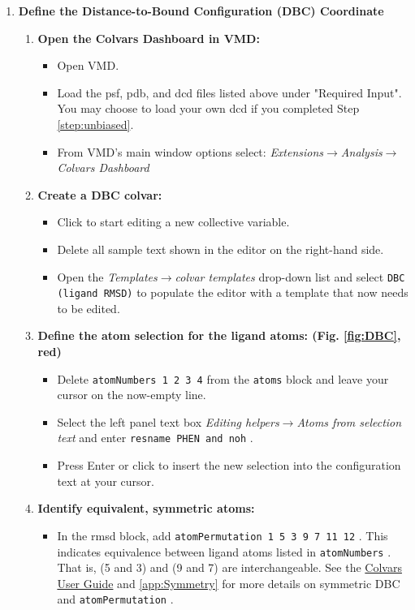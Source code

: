 \documentclass[9pt,tutorial]{Styling/livecoms}
\newcommand{\button}[1]{
  \inlineBox[gray]{\texttt{#1}}
}
\newcommand{\menu}[1]{
  \textit{#1}
}
\newcommand{\option}[1]{
  \texttt{#1}
}
\newcommand{\textInput}[1]{
  \texttt{#1}
}
\begin{document}
\begin{enumerate}
    \item \textbf{Define the Distance-to-Bound Configuration (DBC) Coordinate}
        \begin{enumerate}[label=\alph*., ref=\theenumi.\alph*]
             \item \textbf{Open the Colvars Dashboard in VMD:}
             \begin{itemize}
                \item Open VMD.
                 \item Load the psf, pdb, and dcd files listed above under "Required Input". You may choose to load your own dcd if you completed Step \ref{step:unbiased}.
                 \item From VMD's main window options select: \menu{Extensions$\rightarrow$Analysis$\rightarrow$Colvars Dashboard}
             \end{itemize}
             \item \textbf{Create a DBC colvar:}
             \begin{itemize}
                 \item Click \button{New [Ctrl-n]} to start editing a new collective variable.
                \item Delete all sample text shown in the editor on the right-hand side.
                \item Open the \menu{Templates$\rightarrow$colvar templates} drop-down list and select \option{DBC (ligand RMSD)} to populate the editor with a template that now needs to be edited.
            \end{itemize}
             \item \label{step:ligNumbers}\textbf{Define the atom selection for the ligand atoms: (Fig. \ref{fig:DBC}, red)} 
             \begin{itemize}
                 \item Delete  \textInput{atomNumbers 1 2 3 4} from the \textInput{atoms} block and leave your cursor on the now-empty line.
                 \item Select the left panel text box \menu{Editing helpers$\rightarrow$Atoms from selection text} and enter \textInput{resname PHEN and noh}.
                 \item Press Enter or click \button{Insert [Enter]} to insert the new selection into the configuration text at your cursor.
            \end{itemize}
            \item \label{step:symmetry}\textbf{Identify equivalent, symmetric atoms:}
             \begin{itemize}
                 \item In the rmsd block, add \textInput{atomPermutation 1 5 3 9 7 11 12}. 
                 This indicates equivalence between ligand atoms listed in \textInput{atomNumbers}. That is, (5 and 3) and (9 and 7) are interchangeable. See the \href{https://colvars.github.io/colvars-refman-vmd/colvars-refman-vmd.html#sec:cvc_rmsd}{Colvars User Guide} and \ref{app:Symmetry} for more details on symmetric DBC and \textInput{atomPermutation}.
            \end{itemize}


\end{enumerate}
\end{enumerate}
\end{document}
